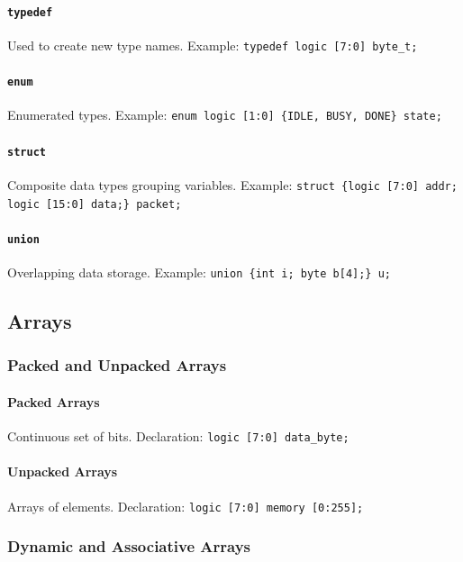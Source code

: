 \paragraph{\texttt{typedef}} Used to create new type names. Example: \texttt{typedef logic [7:0] byte\_t;}

\paragraph{\texttt{enum}} Enumerated types. Example: \texttt{enum logic [1:0] \{IDLE, BUSY, DONE\} state;}

\paragraph{\texttt{struct}} Composite data types grouping variables. Example: \texttt{struct \{logic [7:0] addr; logic [15:0] data;\} packet;}

\paragraph{\texttt{union}} Overlapping data storage. Example: \texttt{union \{int i; byte b[4];\} u;}

\subsection{Arrays}
\subsubsection{Packed and Unpacked Arrays}

\paragraph{\textbf{Packed Arrays}} Continuous set of bits. Declaration: \texttt{logic [7:0] data\_byte;}

\paragraph{\textbf{Unpacked Arrays}} Arrays of elements. Declaration: \texttt{logic [7:0] memory [0:255];}

\subsubsection{Dynamic and Associative Arrays}

